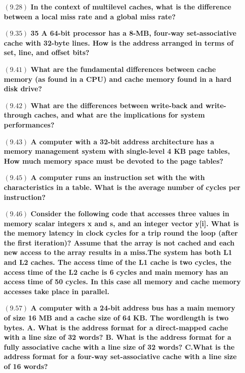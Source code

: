 \documentclass[letterpaper,10pt,titlepage]{article}
\begin{document}
\begin{enumerate}
\item[$(9.28)$] \textbf{In the context of multilevel caches, what is the difference between a local miss rate and a global miss rate?}

\item[$(9.35)$] \textbf{35 A 64-bit processor has a 8-MB, four-way set-associative cache with 32-byte lines. How is the address arranged in terms of set, line, and offset bits?}

\item[$(9.41)$] \textbf{What are the fundamental differences between cache memory (as found in a CPU) and cache memory found in a hard disk drive?}

\item[$(9.42)$] \textbf{What are the differences between write-back and write-through caches, and what are the implications for system performances?}

\item[$(9.43)$] \textbf{A computer with a 32-bit address architecture has a memory management system with single-level 4 KB page tables, How much memory space must be devoted to the page tables?}

\item[$(9.45)$] \textbf{A computer runs an instruction set with the with characteristics in a table. What is the average number of cycles per instruction?}

\item[$(9.46)$] \textbf{Consider the following code that accesses three values in memory scalar integers x and s, and an integer vector y[i]. What is the memory latency in clock cycles for a trip round the loop (after the first iteration)? Assume that the array is not cached and each new access to the array results in a miss.The system has both L1 and L2 caches. The access time of the L1 cache is two cycles, the access time of the L2 cache is 6 cycles and main memory has an access time of 50 cycles. In this case all memory and cache memory accesses take place in parallel.}

\item[$(9.57)$] \textbf{A computer with a 24-bit address bus has a main memory of size 16 MB and a cache size of 64 KB. The wordlength is two bytes. A. What is the address format for a direct-mapped cache with a line size of 32 words? B. What is the address format for a fully associative cache with a line size of 32 words? C.What is the address format for a four-way set-associative cache with a line size of 16 words?}

\end{enumerate}
\end{document}
